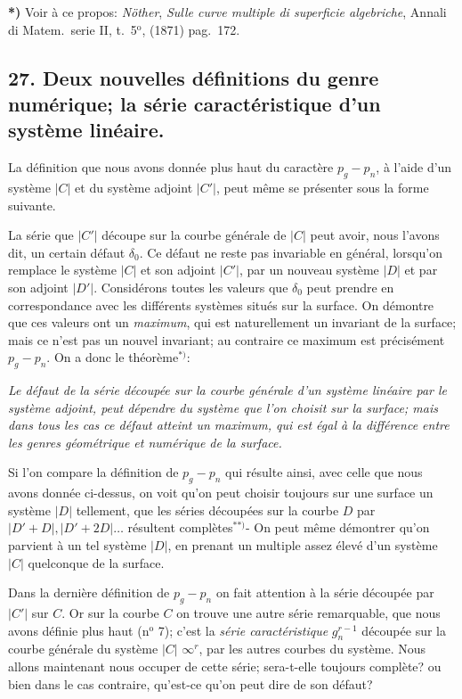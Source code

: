 \documentclass{article}
\begin{document}
\textbf{*)} Voir à ce propos: \emph{Nöther}, \emph{Sulle curve multiple di superficie algebriche}, Annali di Matem.\ serie II, t.\ 5${}^{\text{o}}$, (1871) pag.\ 172.


\subsection*{27. Deux nouvelles définitions du genre numérique; la série caractéristique d'un système linéaire.}

La définition que nous avons donnée plus haut du caractère $p_{g} - p_{n}$, à l'aide d'un système $|C|$ et du système adjoint $|C'|$, peut même se présenter sous la forme suivante.

La série que $|C'|$ découpe sur la courbe générale de $|C|$ peut avoir, nous l'avons dit, un certain défaut $\delta_{0}$. Ce défaut ne reste pas invariable en général, lorsqu'on remplace le système $|C|$ et son adjoint $|C'|$, par un nouveau système $|D|$ et par son adjoint $|D'|$. Considérons toutes les valeurs que $\delta_{0}$ peut prendre en correspondance avec les différents systèmes situés sur la surface. On démontre que ces valeurs ont un \emph{maximum}, qui est naturellement un invariant de la surface; mais ce n'est pas un nouvel invariant; au contraire ce maximum est précisément $p_{g} - p_{n}$. On a donc le théorème${}^{*)}$:

\emph{Le défaut de la série découpée sur la courbe générale d'un système linéaire par le système adjoint, peut dépendre du système que l'on choisit sur la surface; mais dans tous les cas ce défaut atteint un maximum, qui est égal à la différence entre les genres géométrique et numérique de la surface.}

Si l'on compare la définition de $p_{g} - p_{n}$ qui résulte ainsi, avec celle que nous avons donnée ci-dessus, on voit qu'on peut choisir toujours sur une surface un système $|D|$ tellement, que les séries découpées sur la courbe $D$ par $|D'+D|, |D'+2D| \ldots$ résultent complètes${}^{**)}$- On peut même démontrer qu'on parvient à un tel système $|D|$, en prenant un multiple assez élevé d'un système $|C|$ quelconque de la surface.

Dans la dernière définition de $p_{g} - p_{n}$ on fait attention à la série découpée par $|C'|$ sur $C$. Or sur la courbe $C$ on trouve une autre série remarquable, que nous avons définie plus haut (n${}^{\text{o}}$ 7); c'est la \emph{série caractéristique} $g_{n}^{r-1}$ découpée sur la courbe générale du système $|C|$ $\infty^{r}$, par les autres courbes du système. Nous allons maintenant nous occuper de cette série; sera-t-elle toujours complète? ou bien dans le cas contraire, qu'est-ce qu'on peut dire de son défaut?
\end{document}

